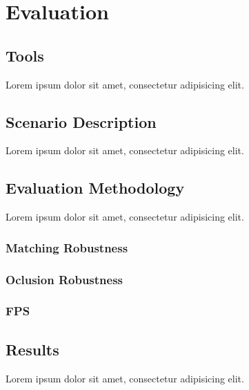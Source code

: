 \chapter{Evaluation} %
\label{cha:evaluation}

\section{Tools} %
\label{sec:evaluation:tools}

Lorem ipsum dolor sit amet, consectetur adipisicing elit.


\section{Scenario Description} %
\label{sec:evaluation:scenario_description}

Lorem ipsum dolor sit amet, consectetur adipisicing elit.


\section{Evaluation Methodology} %
\label{sec:evaluation:evaluation_methodology}

Lorem ipsum dolor sit amet, consectetur adipisicing elit.

\subsection{Matching Robustness} %
\label{sub:evaluation:evaluation_methodology:matching_robustness}


\subsection{Oclusion Robustness} %
\label{sub:evaluation:evaluation_methodology:oclusion_robustness}


\subsection{FPS} %
\label{sub:evaluation:evaluation_methodology:fps}



\section{Results} %
\label{sec:evaluation:results}

Lorem ipsum dolor sit amet, consectetur adipisicing elit.


